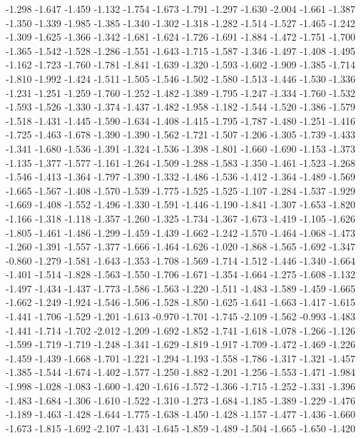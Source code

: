 \documentclass[9pt]{article}
\theoremstyle{plain}
\theoremstyle{definition}
\theoremstyle{remark}
\numberwithin{equation}{section}
\begin{document}
-1.298
-1.647
-1.459
-1.132
-1.754
-1.673
-1.791
-1.297
-1.630
-2.004
-1.661
-1.387
-1.350
-1.339
-1.985
-1.385
-1.340
-1.302
-1.318
-1.282
-1.514
-1.527
-1.465
-1.242
-1.309
-1.625
-1.366
-1.342
-1.681
-1.624
-1.726
-1.691
-1.884
-1.472
-1.751
-1.700
-1.365
-1.542
-1.528
-1.286
-1.551
-1.643
-1.715
-1.587
-1.346
-1.497
-1.408
-1.495
-1.162
-1.723
-1.760
-1.781
-1.841
-1.639
-1.320
-1.593
-1.602
-1.909
-1.385
-1.714
-1.810
-1.992
-1.424
-1.511
-1.505
-1.546
-1.502
-1.580
-1.513
-1.446
-1.530
-1.336
-1.231
-1.251
-1.259
-1.760
-1.252
-1.482
-1.389
-1.795
-1.247
-1.334
-1.760
-1.532
-1.593
-1.526
-1.330
-1.374
-1.437
-1.482
-1.958
-1.182
-1.544
-1.520
-1.386
-1.579
-1.518
-1.431
-1.445
-1.590
-1.634
-1.408
-1.415
-1.795
-1.787
-1.480
-1.251
-1.416
-1.725
-1.463
-1.678
-1.390
-1.390
-1.562
-1.721
-1.507
-1.206
-1.305
-1.739
-1.433
-1.341
-1.680
-1.536
-1.391
-1.324
-1.536
-1.398
-1.801
-1.660
-1.690
-1.153
-1.373
-1.135
-1.377
-1.577
-1.161
-1.264
-1.509
-1.288
-1.583
-1.350
-1.461
-1.523
-1.268
-1.546
-1.413
-1.364
-1.797
-1.390
-1.332
-1.486
-1.536
-1.412
-1.364
-1.489
-1.569
-1.665
-1.567
-1.408
-1.570
-1.539
-1.775
-1.525
-1.525
-1.107
-1.284
-1.537
-1.929
-1.669
-1.408
-1.552
-1.496
-1.330
-1.591
-1.446
-1.190
-1.841
-1.307
-1.653
-1.820
-1.166
-1.318
-1.118
-1.357
-1.260
-1.325
-1.734
-1.367
-1.673
-1.419
-1.105
-1.626
-1.805
-1.461
-1.486
-1.299
-1.459
-1.439
-1.662
-1.242
-1.570
-1.464
-1.068
-1.473
-1.260
-1.391
-1.557
-1.377
-1.666
-1.464
-1.626
-1.020
-1.868
-1.565
-1.692
-1.347
-0.860
-1.279
-1.581
-1.643
-1.353
-1.708
-1.569
-1.714
-1.512
-1.446
-1.340
-1.664
-1.401
-1.514
-1.828
-1.563
-1.550
-1.706
-1.671
-1.354
-1.664
-1.275
-1.608
-1.132
-1.497
-1.434
-1.437
-1.773
-1.586
-1.563
-1.220
-1.511
-1.483
-1.589
-1.459
-1.665
-1.662
-1.249
-1.924
-1.546
-1.506
-1.528
-1.850
-1.625
-1.641
-1.663
-1.417
-1.615
-1.441
-1.706
-1.529
-1.201
-1.613
-0.970
-1.701
-1.745
-2.109
-1.562
-0.993
-1.483
-1.441
-1.714
-1.702
-2.012
-1.209
-1.692
-1.852
-1.741
-1.618
-1.078
-1.266
-1.126
-1.599
-1.719
-1.719
-1.248
-1.341
-1.629
-1.819
-1.917
-1.709
-1.472
-1.469
-1.226
-1.459
-1.439
-1.668
-1.701
-1.221
-1.294
-1.193
-1.558
-1.786
-1.317
-1.321
-1.457
-1.385
-1.544
-1.674
-1.402
-1.577
-1.250
-1.882
-1.201
-1.256
-1.553
-1.471
-1.984
-1.998
-1.028
-1.083
-1.600
-1.420
-1.616
-1.572
-1.366
-1.715
-1.252
-1.331
-1.396
-1.483
-1.684
-1.306
-1.610
-1.522
-1.310
-1.273
-1.684
-1.185
-1.389
-1.229
-1.476
-1.189
-1.463
-1.428
-1.644
-1.775
-1.638
-1.450
-1.428
-1.157
-1.477
-1.436
-1.660
-1.673
-1.815
-1.692
-2.107
-1.431
-1.645
-1.859
-1.489
-1.504
-1.665
-1.650
-1.420
\end{document}
